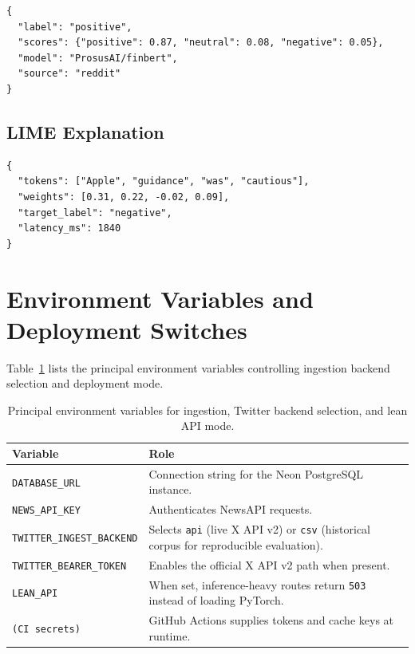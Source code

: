 \begin{lstlisting}[basicstyle=\ttfamily\footnotesize,breaklines=true,frame=single]
{
  "label": "positive",
  "scores": {"positive": 0.87, "neutral": 0.08, "negative": 0.05},
  "model": "ProsusAI/finbert",
  "source": "reddit"
}
\end{lstlisting}

\subsection*{LIME Explanation}

\begin{lstlisting}[basicstyle=\ttfamily\footnotesize,breaklines=true,frame=single]
{
  "tokens": ["Apple", "guidance", "was", "cautious"],
  "weights": [0.31, 0.22, -0.02, 0.09],
  "target_label": "negative",
  "latency_ms": 1840
}
\end{lstlisting}

\section{Environment Variables and Deployment Switches}
\label{app:env_table}

Table~\ref{tab:env_vars} lists the principal environment variables controlling ingestion backend selection and deployment mode.

\begin{table}[!ht]
\centering
\small
\caption{Principal environment variables for ingestion, Twitter backend selection, and lean API mode.}
\label{tab:env_vars}
\begin{tabular}{@{}p{4.6cm}p{8.4cm}@{}}
\toprule
\textbf{Variable} & \textbf{Role} \\
\midrule
\texttt{DATABASE\_URL}            & Connection string for the Neon PostgreSQL instance. \\
\texttt{NEWS\_API\_KEY}           & Authenticates NewsAPI requests. \\
\texttt{TWITTER\_INGEST\_BACKEND} & Selects \texttt{api} (live X API v2) or \texttt{csv} (historical corpus for reproducible evaluation). \\
\texttt{TWITTER\_BEARER\_TOKEN}   & Enables the official X API v2 path when present. \\
\texttt{LEAN\_API}                & When set, inference-heavy routes return \texttt{503} instead of loading PyTorch. \\
\texttt{(CI secrets)}             & GitHub Actions supplies tokens and cache keys at runtime. \\
\bottomrule
\end{tabular}
\end{table}

